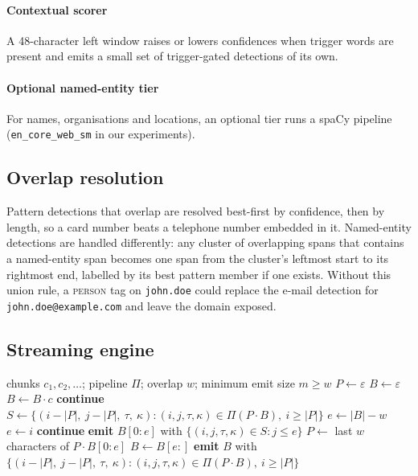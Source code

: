 \documentclass[pdflatex,sn-mathphys-num]{sn-jnl}
\theoremstyle{\ssThmStyle}
\theoremstyle{\ssDefStyle}
\begin{document}
\paragraph{Contextual scorer}
A 48-character left window raises or lowers confidences when trigger words are present and emits a small set of trigger-gated detections of its own.

\paragraph{Optional named-entity tier}
For names, organisations and locations, an optional tier runs a spaCy pipeline (\texttt{en\_core\_web\_sm} in our experiments).

\subsection{Overlap resolution}
Pattern detections that overlap are resolved best-first by confidence, then by length, so a card number beats a telephone number embedded in it. Named-entity detections are handled differently: any cluster of overlapping spans that contains a named-entity span becomes one span from the cluster's leftmost start to its rightmost end, labelled by its best pattern member if one exists. Without this union rule, a \textsc{person} tag on \texttt{john.doe} could replace the e-mail detection for \texttt{john.doe@example.com} and leave the domain exposed.

\subsection{Streaming engine}\label{sec:engine}

\begin{algorithm}[t]
\caption{Streaming detection with overlap $w$}\label{alg:stream}
\begin{algorithmic}[1]
\Require chunks $c_1, c_2, \dots$; pipeline $\Pi$; overlap $w$; minimum emit size $m \ge w$
\State $P \gets \varepsilon$ 
\State $B \gets \varepsilon$ 
  \State $B \gets B \cdot c$
    \State \textbf{continue}
  \EndIf
  \State $S \gets \{(i - |P|,\ j - |P|,\ \tau,\ \kappa) : (i, j, \tau, \kappa) \in \Pi(P \cdot B),\ i \ge |P|\}$
  \State $e \gets |B| - w$ 
    \State $e \gets i$ 
  \EndWhile
    \State \textbf{continue} 
  \EndIf
  \State \textbf{emit} $B[0{:}e]$ with $\{(i, j, \tau, \kappa) \in S : j \le e\}$
  \State $P \gets$ last $w$ characters of $P \cdot B[0{:}e]$
  \State $B \gets B[e{:}]$
\EndFor
\State \textbf{emit} $B$ with $\{(i - |P|,\ j - |P|,\ \tau,\ \kappa) : (i, j, \tau, \kappa) \in \Pi(P \cdot B),\ i \ge |P|\}$
\end{algorithmic}
\end{algorithm}
\end{document}
